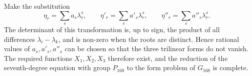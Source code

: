 \documentclass[11pt]{article}
\begin{document}
Make the substitution
\begin{equation}
\eta_r=\sum_s a_s\lambda_r^s,
\qquad
\eta'_r=\sum_s a'_s\lambda_r^s,
\qquad
\eta''_r=\sum_s a''_s\lambda_r^s.
\tag{2}
\end{equation}
The determinant of this transformation is, up to sign, the product of all differences \(\lambda_i-\lambda_k\), and is non-zero when the roots are distinct. Hence rational values of \(a_s,a'_s,a''_s\) can be chosen so that the three trilinear forms do not vanish. The required functions \(X_1,X_2,X_3\) therefore exist, and the reduction of the seventh-degree equation with group \(P_{168}\) to the form problem of \(G_{168}\) is complete.
\end{document}
